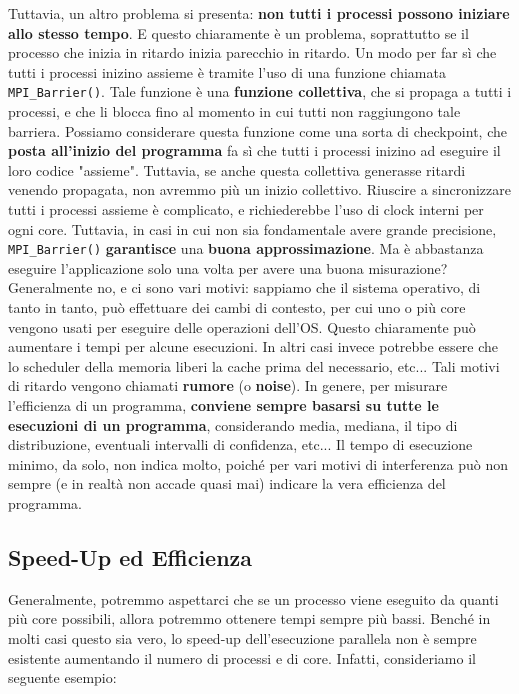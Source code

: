 Tuttavia, un altro problema si presenta: \textbf{non tutti i processi possono iniziare allo stesso tempo}. E questo chiaramente è un problema, soprattutto se il processo che inizia in ritardo inizia parecchio in ritardo. Un modo per far sì che tutti i processi inizino assieme è tramite l'uso di una funzione chiamata \verb|MPI_Barrier()|. Tale funzione è una \textbf{funzione collettiva}, che si propaga a tutti i processi, e che li blocca fino al momento in cui tutti non raggiungono tale barriera. Possiamo considerare questa funzione come una sorta di checkpoint, che \textbf{posta all'inizio del programma} fa sì che tutti i processi inizino ad eseguire il loro codice "assieme".
\nwl
Tuttavia, se anche questa collettiva generasse ritardi venendo propagata, non avremmo più un inizio collettivo. Riuscire a sincronizzare tutti i processi assieme è complicato, e richiederebbe l'uso di clock interni per ogni core. Tuttavia, in casi in cui non sia fondamentale avere grande precisione, \verb|MPI_Barrier()| \textbf{garantisce} una \textbf{buona approssimazione}.
\nwl
Ma è abbastanza eseguire l'applicazione solo una volta per avere una buona misurazione? Generalmente no, e ci sono vari motivi: sappiamo che il sistema operativo, di tanto in tanto, può effettuare dei cambi di contesto, per cui uno o più core vengono usati per eseguire delle operazioni dell'OS. Questo chiaramente può aumentare i tempi per alcune esecuzioni. In altri casi invece potrebbe essere che lo scheduler della memoria liberi la cache prima del necessario, etc...
\nwl
Tali motivi di ritardo vengono chiamati \textbf{rumore} (o \textbf{noise}). In genere, per misurare l'efficienza di un programma, \textbf{conviene sempre basarsi su tutte le esecuzioni di un programma}, considerando media, mediana, il tipo di distribuzione, eventuali intervalli di confidenza, etc... Il tempo di esecuzione minimo, da solo, non indica molto, poiché per vari motivi di interferenza può non sempre (e in realtà non accade quasi mai) indicare la vera efficienza del programma.

\subsection{Speed-Up ed Efficienza}

Generalmente, potremmo aspettarci che se un processo viene eseguito da quanti più core possibili, allora potremmo ottenere tempi sempre più bassi. Benché in molti casi questo sia vero, lo speed-up dell'esecuzione parallela non è sempre esistente aumentando il numero di processi e di core. Infatti, consideriamo il seguente esempio:

